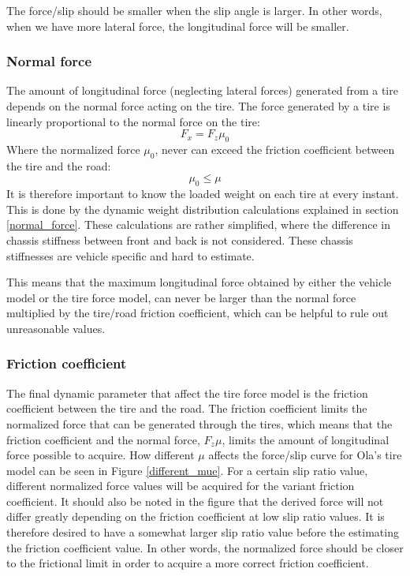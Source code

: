  The force/slip should be smaller when the slip angle is larger. In other words, when we have more lateral force, the longitudinal force will be smaller.

\subsubsection{Normal force}
The amount of longitudinal force (neglecting lateral forces) generated from a tire depends on the normal force acting on the tire. The force generated by a tire is linearly proportional to the normal force on the tire:
\begin{equation}
	F_{x} = F_{z}\mu_{0}
\end{equation}
Where the normalized force $ \mu_{0} $, never can exceed the friction coefficient between the tire and the road:
\begin{equation}
	\mu_{0} \leq \mu
\end{equation}
It is therefore important to know the loaded weight on each tire at every instant. This is done by the dynamic weight distribution calculations explained in section \ref{normal_force}. These calculations are rather simplified, where the difference in chassis stiffness between front and back is not considered. These chassis stiffnesses are vehicle specific and hard to estimate. 

This means that the maximum longitudinal force obtained by either the vehicle model or the tire force model, can never be larger than the normal force multiplied by the tire/road friction coefficient, which can be helpful to rule out unreasonable values. 

\subsubsection{Friction coefficient}
\label{section_friction coefficient}
The final dynamic parameter that affect the tire force model is the friction coefficient between the tire and the road. The friction coefficient limits the normalized force that can be generated through the tires, which means that the friction coefficient and the normal force, $ F_{z}\mu $, limits the amount of longitudinal force possible to acquire. How different $ \mu $ affects the force/slip curve for Ola's tire model can be seen in Figure \ref{different_mue}. For a certain slip ratio value, different normalized force values will be acquired for the variant friction coefficient. It should also be noted in the figure that the derived force will not differ greatly depending on the friction coefficient at low slip ratio values. It is therefore desired to have a somewhat larger slip ratio value before the estimating the friction coefficient value. In other words, the normalized force should be closer to the frictional limit in order to acquire a more correct friction coefficient. 

